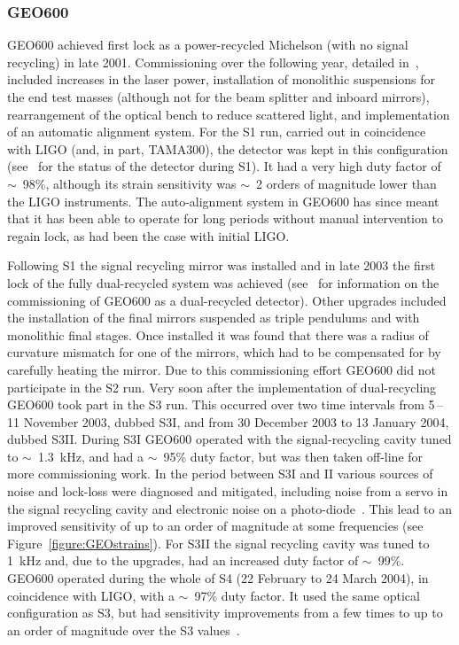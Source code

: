 \subsubsection{GEO600}

GEO600 achieved first lock as a power-recycled Michelson (with no signal recycling) in late 2001. 
Commissioning over the following year, detailed in~\cite{Hewitson:2003}, included increases in the laser
power, installation of monolithic suspensions for the end test masses (although not for the beam splitter and 
inboard mirrors), rearrangement of the optical bench to reduce scattered light, and implementation of an 
automatic alignment system. For the S1 run, carried out in coincidence with LIGO (and, in part, TAMA300), the
detector was kept in this configuration (see~\cite{Abbott:2004a} for the status of the detector during S1). 
It had a very high duty factor of $\sim$~98\%, although its strain sensitivity was $\sim$~2 orders of
magnitude lower than the LIGO instruments. The auto-alignment system in GEO600 has since meant that it has 
been able to operate for long periods without manual intervention to regain lock, as had been the
case with initial LIGO.

Following S1 the signal recycling mirror was installed and in late 2003 the first lock of the fully 
dual-recycled system was achieved (see~\cite{Smith:2004, Willke:2004, Grote:2005} for information on the
commissioning of GEO600 as a dual-recycled detector). Other upgrades included the installation of the final 
mirrors suspended as triple pendulums and with monolithic final stages. Once installed it was found that 
there was a radius of curvature mismatch for one of the mirrors, which had to be compensated for by
carefully heating the mirror. Due to this commissioning effort GEO600 did not participate in the S2 run. Very 
soon after the implementation of dual-recycling GEO600 took part in the S3 run. This occurred over two time 
intervals from 5\,--\,11 November 2003, dubbed S3I, and from 30 December 2003 to 13 January 2004,
dubbed S3II. During S3I GEO600 operated with the signal-recycling cavity tuned to $\sim$~1.3~kHz, and had a 
$\sim$~95\% duty factor, but was then taken off-line for more commissioning work. In the period between S3I 
and II various sources of noise and lock-loss were diagnosed and mitigated, including noise from a servo in 
the signal recycling cavity and electronic noise on a photo-diode~\cite{Smith:2004}. This lead to an improved 
sensitivity of up to an order of magnitude at some frequencies (see Figure~\ref{figure:GEOstrains}). For
S3II the signal recycling cavity was tuned to 1~kHz and, due to the upgrades, had an increased duty factor of 
$\sim$~99\%. GEO600 operated during the whole of S4 (22 February to 24 March 2004), in coincidence with LIGO, 
with a $\sim$~97\% duty factor. It used the same optical configuration as S3, but had sensitivity
improvements from a few times to up to an order of magnitude over the S3 values~\cite{Hild:2006a}.

